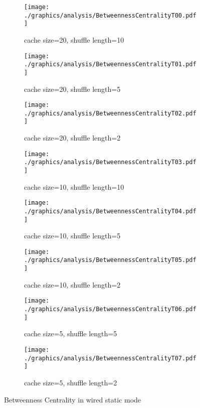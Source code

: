 \begin{figure}
\begin{subfigure}{.5\textwidth}
	\texttt{[image: ./graphics/analysis/BetweennessCentralityT00.pdf]}
	\caption{cache size=20, shuffle
	length=10}
	\label{fig:betweennessCentralityT00small}
\end{subfigure}%
\begin{subfigure}{.5\textwidth}
	\texttt{[image: ./graphics/analysis/BetweennessCentralityT01.pdf]}
	\caption{cache size=20, shuffle
	length=5}
	\label{fig:betweennessCentralityT01small}
\end{subfigure}
\begin{subfigure}{.5\textwidth}
	\texttt{[image: ./graphics/analysis/BetweennessCentralityT02.pdf]}
	\caption{cache size=20, shuffle
	length=2}
	\label{fig:betweennessCentralityT02small}
\end{subfigure}%
\begin{subfigure}{.5\textwidth}
	\texttt{[image: ./graphics/analysis/BetweennessCentralityT03.pdf]}
	\caption{cache size=10, shuffle
	length=10}
	\label{fig:betweennessCentralityT03small}
\end{subfigure}
\begin{subfigure}{.5\textwidth}
	\texttt{[image: ./graphics/analysis/BetweennessCentralityT04.pdf]}
	\caption{cache size=10, shuffle
	length=5}
	\label{fig:betweennessCentralityT04small}
\end{subfigure}%
\begin{subfigure}{.5\textwidth}
	\texttt{[image: ./graphics/analysis/BetweennessCentralityT05.pdf]}
	\caption{cache size=10, shuffle length=2}
	\label{fig:betweennessCentralityT05small}
\end{subfigure}
\begin{subfigure}{.5\textwidth}
	\texttt{[image: ./graphics/analysis/BetweennessCentralityT06.pdf]}
	\caption{cache size=5, shuffle
	length=5}
	\label{fig:betweennessCentralityT06small}
\end{subfigure}%
\begin{subfigure}{.5\textwidth}
	\texttt{[image: ./graphics/analysis/BetweennessCentralityT07.pdf]}
	\caption{cache size=5, shuffle
	length=2}
	\label{fig:betweennessCentralityT07small}
\end{subfigure}
\caption{Betweenness Centrality in wired static mode}
\end{figure}


	
	
	
	
	
	
	
	